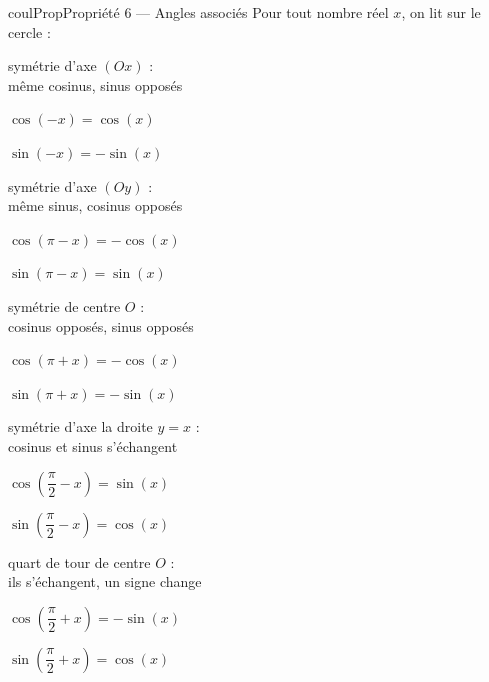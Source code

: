 \documentclass[11pt,a4paper]{article}
\makeatletter
\newcounter{lycee@signet}
\newcommand{\signet}[3][]{\stepcounter{lycee@signet}%
  \edef\lycee@dest{\if\relax\detokenize{#1}\relax
    signet.\arabic{lycee@signet}\else#1\fi}%
  \hypertarget{\lycee@dest}{}\bookmark[level=#2,dest=\lycee@dest]{#3}}
\newenvironment{proprietebox}[1][Propriété]%
  {\begin{boitecours}[phantom={\signet{2}{#1}}]{coulProp}{#1}}{\end{boitecours}}
\makeatother
\begin{document}
\begin{proprietebox}[Propriété 6 --- Angles associés]
Pour tout nombre réel $x$, on lit sur le cercle :

\medskip
\begin{minipage}[t]{0.32\linewidth}\centering
{}\par
{\small symétrie d'axe $(Ox)$ :\\ même cosinus, sinus opposés}\par\smallskip
$\cos(-x)=\cos(x)$\par
$\sin(-x)=-\sin(x)$
\end{minipage}\hfill
\begin{minipage}[t]{0.32\linewidth}\centering
{}\par
{\small symétrie d'axe $(Oy)$ :\\ même sinus, cosinus opposés}\par\smallskip
$\cos(\pi-x)=-\cos(x)$\par
$\sin(\pi-x)=\sin(x)$
\end{minipage}\hfill
\begin{minipage}[t]{0.32\linewidth}\centering
{}\par
{\small symétrie de centre $O$ :\\ cosinus opposés, sinus opposés}\par\smallskip
$\cos(\pi+x)=-\cos(x)$\par
$\sin(\pi+x)=-\sin(x)$
\end{minipage}

\medskip
\bigskip
\hfill
\begin{minipage}[t]{0.32\linewidth}\centering
{}\par
{\small symétrie d'axe la droite $y=x$ :\\ cosinus et sinus s'échangent}\par\smallskip
$\cos\left(\dfrac{\pi}{2}-x\right)=\sin(x)$\par\smallskip
$\sin\left(\dfrac{\pi}{2}-x\right)=\cos(x)$
\end{minipage}\hspace{1.5cm}
\begin{minipage}[t]{0.32\linewidth}\centering
{}\par
{\small quart de tour de centre $O$ :\\ ils s'échangent, un signe change}\par\smallskip
$\cos\left(\dfrac{\pi}{2}+x\right)=-\sin(x)$\par\smallskip
$\sin\left(\dfrac{\pi}{2}+x\right)=\cos(x)$
\end{minipage}
\hfill\null


\end{proprietebox}
\end{document}
